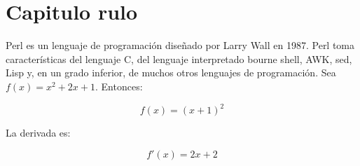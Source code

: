 \section{Capitulo rulo}
Perl es un lenguaje de programación diseñado por Larry Wall en 1987. Perl toma características del lenguaje C, del lenguaje interpretado bourne shell, AWK, sed, Lisp y, en un grado inferior, de muchos otros lenguajes de programación.
Sea \( f(x) = x^2 + 2x + 1 \). Entonces:

\[
f(x) = (x+1)^2
\]

La derivada es:

\[
f'(x) = 2x + 2
\]